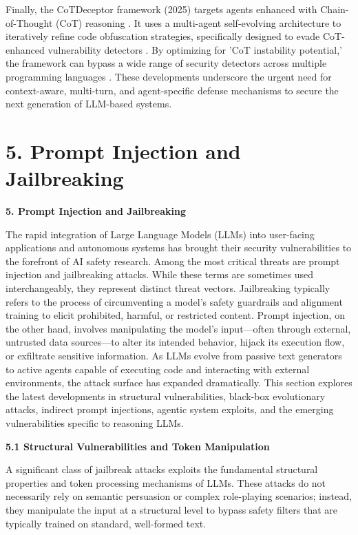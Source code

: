 \documentclass[11pt,a4paper]{article}
\begin{document}
Finally, the CoTDeceptor framework (2025) targets agents enhanced with Chain-of-Thought (CoT) reasoning \cite{Li_2025_CoT}. It uses a multi-agent self-evolving architecture to iteratively refine code obfuscation strategies, specifically designed to evade CoT-enhanced vulnerability detectors \cite{Li_2025_CoT}. By optimizing for 'CoT instability potential,' the framework can bypass a wide range of security detectors across multiple programming languages \cite{Li_2025_CoT}. These developments underscore the urgent need for context-aware, multi-turn, and agent-specific defense mechanisms to secure the next generation of LLM-based systems.

\section{5. Prompt Injection and Jailbreaking}

\textbf{5. Prompt Injection and Jailbreaking}

The rapid integration of Large Language Models (LLMs) into user-facing applications and autonomous systems has brought their security vulnerabilities to the forefront of AI safety research. Among the most critical threats are prompt injection and jailbreaking attacks. While these terms are sometimes used interchangeably, they represent distinct threat vectors. Jailbreaking typically refers to the process of circumventing a model's safety guardrails and alignment training to elicit prohibited, harmful, or restricted content. Prompt injection, on the other hand, involves manipulating the model's input---often through external, untrusted data sources---to alter its intended behavior, hijack its execution flow, or exfiltrate sensitive information. As LLMs evolve from passive text generators to active agents capable of executing code and interacting with external environments, the attack surface has expanded dramatically. This section explores the latest developments in structural vulnerabilities, black-box evolutionary attacks, indirect prompt injections, agentic system exploits, and the emerging vulnerabilities specific to reasoning LLMs.

\textbf{5.1 Structural Vulnerabilities and Token Manipulation}

A significant class of jailbreak attacks exploits the fundamental structural properties and token processing mechanisms of LLMs. These attacks do not necessarily rely on semantic persuasion or complex role-playing scenarios; instead, they manipulate the input at a structural level to bypass safety filters that are typically trained on standard, well-formed text.
\end{document}
